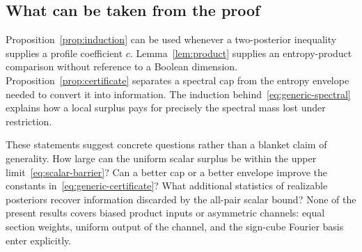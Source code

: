 \subsection{What can be taken from the proof}
Proposition~\ref{prop:induction} can be used whenever a two-posterior inequality supplies a profile coefficient $c$. Lemma~\ref{lem:product} supplies an entropy-product comparison without reference to a Boolean dimension. Proposition~\ref{prop:certificate} separates a spectral cap from the entropy envelope needed to convert it into information. The induction behind~\eqref{eq:generic-spectral} explains how a local surplus pays for precisely the spectral mass lost under restriction.

These statements suggest concrete questions rather than a blanket claim of generality. How large can the uniform scalar surplus be within the upper limit~\eqref{eq:scalar-barrier}? Can a better cap or a better envelope improve the constants in~\eqref{eq:generic-certificate}? What additional statistics of realizable posteriors recover information discarded by the all-pair scalar bound? None of the present results covers biased product inputs or asymmetric channels: equal section weights, uniform output of the channel, and the sign-cube Fourier basis enter explicitly.
